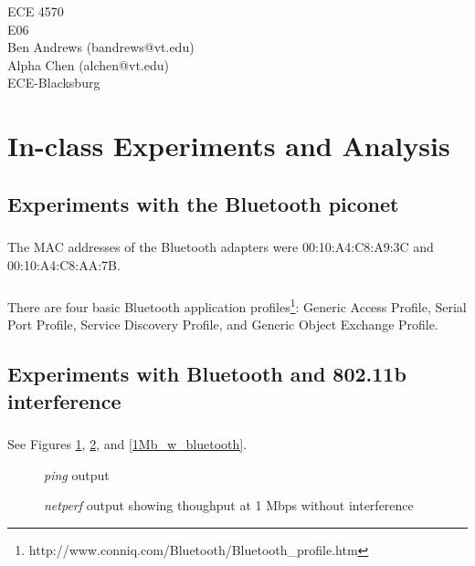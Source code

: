 \documentclass[11pt]{article}
\begin{document}
\begin{flushright}
{ECE 4570}\\{E06}\\{Ben Andrews (bandrews@vt.edu)}\\{Alpha Chen (alchen@vt.edu)}\\{ECE-Blacksburg}\end{flushright}

\section{In-class Experiments and Analysis}

\subsection{Experiments with the Bluetooth piconet}

\subsubsection{}

The MAC addresses of the Bluetooth adapters were 00:10:A4:C8:A9:3C and 00:10:A4:C8:AA:7B.

\subsubsection{}

There are four basic Bluetooth application profiles\footnote{http://www.conniq.com/Bluetooth/Bluetooth\_profile.htm}: Generic Access Profile, Serial Port Profile, Service Discovery Profile, and Generic Object Exchange Profile.

\subsection{Experiments with Bluetooth and 802.11b interference}

\subsubsection{}

See Figures \ref{ping}, \ref{1Mb_no_bluetooth}, and \ref{1Mb_w_bluetooth}.

\begin{figure}[hp]
	\caption{\emph{ping} output}
	\label{ping}
\end{figure}

\begin{figure}[hp]
	\caption{\emph{netperf} output showing thoughput at 1 Mbps without interference}
	\label{1Mb_no_bluetooth}
\end{figure}
\end{document}
